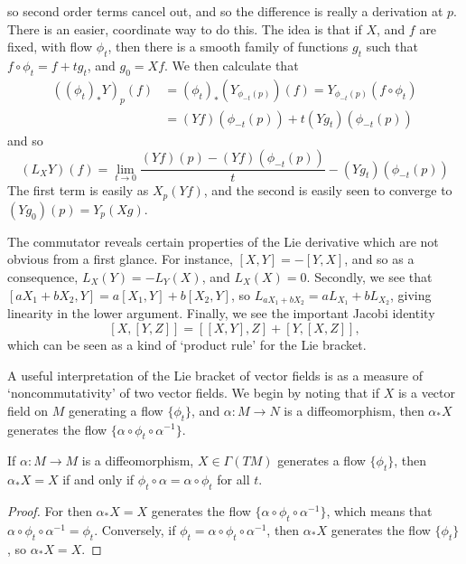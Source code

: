 so second order terms cancel out, and so the difference is really a derivation at $p$. There is an easier, coordinate way to do this. The idea is that if $X$, and $f$ are fixed, with flow $\phi_t$, then there is a smooth family of functions $g_t$ such that $f \circ \phi_t = f + t g_t$, and $g_0 = Xf$. We then calculate that
%
\begin{align*}
    ((\phi_t)_* Y)_p(f) &= (\phi_t)_*(Y_{\phi_{-t}(p)})(f) = Y_{\phi_{-t}(p)}(f \circ \phi_t)\\
    &= (Yf)(\phi_{-t}(p)) + t (Yg_t)(\phi_{-t}(p))
\end{align*}
%
and so
%
\[ (L_X Y)(f) = \lim_{t \to 0} \frac{(Yf)(p) - (Yf)(\phi_{-t}(p))}{t} - (Yg_t)(\phi_{-t}(p)) \]
%
The first term is easily as $X_p(Yf)$, and the second is easily seen to converge to $(Yg_0)(p) = Y_p(Xg)$.

The commutator reveals certain properties of the Lie derivative which are not obvious from a first glance. For instance, $[X,Y] = -[Y,X]$, and so as a consequence, $L_X(Y) = -L_Y(X)$, and $L_X(X) = 0$. Secondly, we see that $[aX_1 + bX_2,Y] = a[X_1,Y] + b[X_2,Y]$, so $L_{aX_1 + bX_2} = aL_{X_1} + bL_{X_2}$, giving linearity in the lower argument. Finally, we see the important Jacobi identity
%
\[ [X,[Y,Z]] = [[X,Y],Z] + [Y,[X,Z]], \]
%
which can be seen as a kind of `product rule' for the Lie bracket.

A useful interpretation of the Lie bracket of vector fields is as a measure of `noncommutativity' of two vector fields. We begin by noting that if $X$ is a vector field on $M$ generating a flow $\{ \phi_t \}$, and $\alpha: M \to N$ is a diffeomorphism, then $\alpha_* X$ generates the flow $\{ \alpha \circ \phi_t \circ \alpha^{-1} \}$.

\begin{lemma}
    If $\alpha: M \to M$ is a diffeomorphism, $X \in \Gamma(TM)$ generates a flow $\{ \phi_t \}$, then $\alpha_* X = X$  if and only if $\phi_t \circ \alpha = \alpha \circ \phi_t$ for all $t$.
\end{lemma}
\begin{proof}
    For then $\alpha_* X = X$ generates the flow $\{ \alpha \circ \phi_t \circ \alpha^{-1} \}$, which means that $\alpha \circ \phi_t \circ \alpha^{-1} = \phi_t$. Conversely, if $\phi_t = \alpha \circ \phi_t \circ \alpha^{-1}$, then $\alpha_* X$ generates the flow $\{ \phi_t \}$, so $\alpha_* X = X$.
\end{proof}

